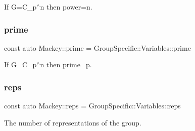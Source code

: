 If G=C\+\_\+p$^\wedge$n then power=n. 

\mbox{\label{namespaceMackey_a77e059c6f9b4c6ea096fcf94a7880bc3}} 
\subsubsection{\texorpdfstring{prime}{prime}}
{\footnotesize\ttfamily const auto Mackey\+::prime = Group\+Specific\+::\+Variables\+::prime}



If G=C\+\_\+p$^\wedge$n then prime=p. 

\mbox{\label{namespaceMackey_af282e8433677f2812cb242359f4cd0c1}} 
\subsubsection{\texorpdfstring{reps}{reps}}
{\footnotesize\ttfamily const auto Mackey\+::reps = Group\+Specific\+::\+Variables\+::reps}



The number of representations of the group. 

